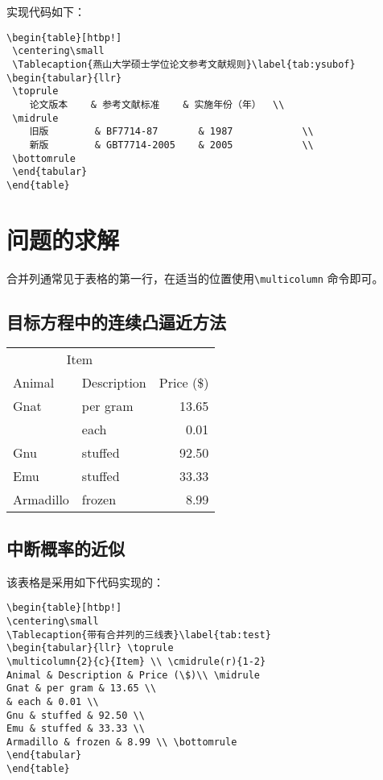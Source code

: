 实现代码如下：
\begin{verbatim}
\begin{table}[htbp!]
 \centering\small
 \Tablecaption{燕山大学硕士学位论文参考文献规则}\label{tab:ysubof}
\begin{tabular}{llr}
 \toprule
    论文版本    & 参考文献标准    & 实施年份（年）  \\
 \midrule
    旧版        & BF7714-87       & 1987            \\
    新版        & GBT7714-2005    & 2005            \\
 \bottomrule
 \end{tabular}
\end{table}
\end{verbatim}

\section{问题的求解}\label{section3-3}
合并列通常见于表格的第一行，在适当的位置使用\verb|\multicolumn| 命令即可。
\subsection{目标方程中的连续凸逼近方法}\label{section3-3-1}
\begin{table}[htbp!]
\centering\small
{}\label{tab:test}
\begin{tabular}{llr} \toprule
\multicolumn{2}{c}{Item} \\ \cmidrule(r){1-2}
Animal & Description & Price (\$)\\ \midrule
Gnat & per gram & 13.65 \\
& each & 0.01 \\
Gnu & stuffed & 92.50 \\
Emu & stuffed & 33.33 \\
Armadillo & frozen & 8.99 \\ \bottomrule
\end{tabular}
\end{table}

\subsection{中断概率的近似}\label{section3-3-2}
该表格是采用如下代码实现的：
\begin{verbatim}
\begin{table}[htbp!]
\centering\small
\Tablecaption{带有合并列的三线表}\label{tab:test}
\begin{tabular}{llr} \toprule
\multicolumn{2}{c}{Item} \\ \cmidrule(r){1-2}
Animal & Description & Price (\$)\\ \midrule
Gnat & per gram & 13.65 \\
& each & 0.01 \\
Gnu & stuffed & 92.50 \\
Emu & stuffed & 33.33 \\
Armadillo & frozen & 8.99 \\ \bottomrule
\end{tabular}
\end{table}
\end{verbatim}
